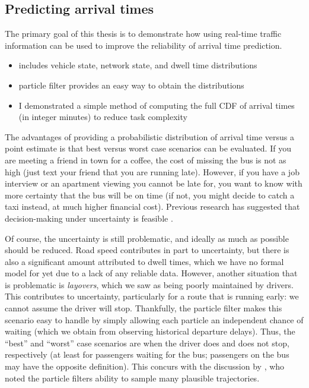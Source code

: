 \subsection{Predicting arrival times}


The primary goal of this thesis is to demonstrate how using real-time traffic information can be used to improve the reliability of arrival time prediction.
\begin{itemize}
  \item includes vehicle state, network state, and dwell time distributions
  \item particle filter provides an easy way to obtain the distributions
  \item I demonstrated a simple method of computing the full CDF of arrival times (in integer minutes) to reduce task complexity
\end{itemize}


The advantages of providing a probabilistic distribution of arrival time versus a point estimate is that best versus worst case scenarios can be evaluated. If you are meeting a friend in town for a coffee, the cost of missing the bus is not as high (just text your friend that you are running late). However, if you have a job interview or an apartment viewing you cannot be late for, you want to know with more certainty that the bus will be on time (if not, you might decide to catch a taxi instead, at much higher financial cost). Previous research has suggested that decision-making under uncertainty is feasible \citep{Fernandes_2018}.


Of course, the uncertainty is still problematic, and ideally as much as possible should be reduced. Road speed contributes in part to uncertainty, but there is also a significant amount attributed to dwell times, which we have no formal model for yet due to a lack of any reliable data. However, another situation that is problematic is \emph{layovers}, which we saw as being poorly maintained by drivers. This contributes to uncertainty, particularly for a route that is running early: we cannot assume the driver will stop. Thankfully, the particle filter makes this scenario easy to handle by simply allowing each particle an independent chance of waiting (which we obtain from observing historical departure delays). Thus, the ``best'' and ``worst'' case scenarios are when the driver does and does not stop, respectively (at least for passengers waiting for the bus; passengers on the bus may have the opposite definition). This concurs with the discussion by \citet{Hans_2015}, who noted the particle filters ability to sample many plausible trajectories.


